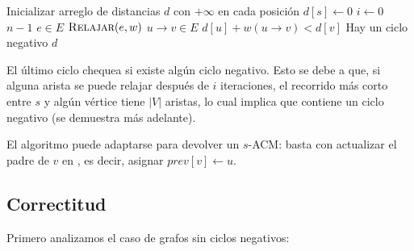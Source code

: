 \begin{codebox}
    \li Inicializar arreglo de distancias $d$ con $+\infty$ en cada posición
    \li $d[s] \gets 0$
    \li \For $i \gets 0$ \To $n - 1$ \Do
    \li \For \Each $e \in E$ \Do
    \li $\textnormal{\scshape Relajar}(e, w)$
    \End
    \End
    \li \For \Each $u \rightarrow v \in E$ \Do
    \li \If $d[u] + w(u \rightarrow v) < d[v]$ \Then
    \li \Return Hay un ciclo negativo
    \End
    \End
    \li \Return $d$
\end{codebox}

El último ciclo chequea si existe algún ciclo negativo. Esto se debe a que, si alguna arista se puede relajar después de $i$ iteraciones, el recorrido más corto entre $s$ y algún vértice tiene $|V|$ aristas, lo cual implica que contiene un ciclo negativo (se demuestra más adelante).

El algoritmo puede adaptarse para devolver un $s$-ACM: basta con actualizar el padre de $v$ en , es decir, asignar $prev[v] \gets u$.

\subsection{Correctitud}

Primero analizamos el caso de grafos sin ciclos negativos:

